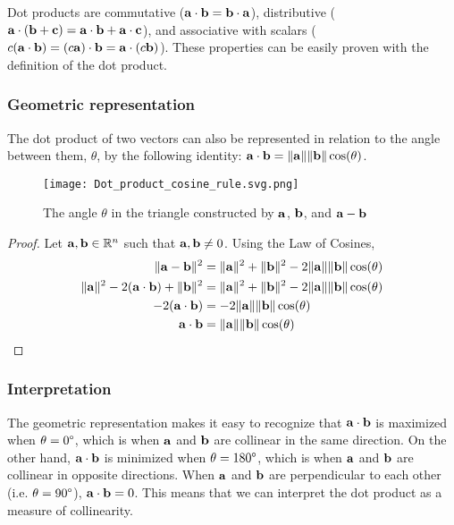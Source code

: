 \documentclass[../main.tex]{subfiles}
\begin{document}
Dot products are commutative ($\mathbf{a} \cdot \mathbf{b} = \mathbf{b} \cdot \mathbf{a}$),
distributive ($\mathbf{a} \cdot (\mathbf{b} + \mathbf{c}) = \mathbf{a} \cdot \mathbf{b} + \mathbf{a} \cdot \mathbf{c}$),
and associative with scalars ($c(\mathbf{a} \cdot \mathbf{b}) = (c\mathbf{a}) \cdot \mathbf{b} = \mathbf{a} \cdot (c\mathbf{b})$).
These properties can be easily proven with the definition of the dot product.

\subsubsection{Geometric representation}

The dot product of two vectors can also
be represented in relation to the angle between them, $\theta$, by
the following identity: $\mathbf{a} \cdot \mathbf{b} = \|\mathbf{a}\| \|\mathbf{b}\| \cos (\theta)$.

\begin{figure}[H]
	\centering
	\texttt{[image: Dot\_product\_cosine\_rule.svg.png]}
	\caption{The angle $\theta$ in the triangle constructed
		by $\mathbf{a}$, $\mathbf{b}$, and $\mathbf{a} - \mathbf{b}$}
\end{figure}

\begin{proof}
	Let $\mathbf{a}, \mathbf{b} \in \mathbb{R}^n$ such that $\mathbf{a}, \mathbf{b} \neq 0$. Using the Law of Cosines,
	\begin{align*}
		\|\mathbf{a}-\mathbf{b}\|^2                                    & = \|\mathbf{a}\|^2 + \|\mathbf{b}\|^2 - 2\|\mathbf{a}\| \|\mathbf{b}\| \cos (\theta) \\
		\|\mathbf{a}\|^2 - 2(\mathbf{a}\cdot\mathbf{b}) + \|\mathbf{b}\|^2 & = \|\mathbf{a}\|^2+\|\mathbf{b}\|^2-2\|\mathbf{a}\|\|\mathbf{b}\|\cos (\theta)       \\
		-2(\mathbf{a}\cdot\mathbf{b})                                  & =-2\|\mathbf{a}\|\|\mathbf{b}\|\cos (\theta)                                     \\
		\mathbf{a}\cdot\mathbf{b}                                      & =\|\mathbf{a}\|\|\mathbf{b}\|\cos (\theta)                                       \\
	\end{align*}
\end{proof}

\subsubsection{Interpretation}

The geometric representation makes it easy to recognize that
$\mathbf{a}\cdot\mathbf{b}$ is maximized when $\theta=0\degree$, which is
when $\mathbf{a}$ and $\mathbf{b}$ are collinear in the same direction.
On the other hand, $\mathbf{a}\cdot\mathbf{b}$ is minimized when $\theta=180\degree$,
which is when $\mathbf{a}$ and $\mathbf{b}$ are collinear in opposite directions.
When $\mathbf{a}$ and $\mathbf{b}$ are perpendicular to each other (i.e. $\theta=90\degree$),
$\mathbf{a}\cdot\mathbf{b}=0$. This means that we can interpret the dot product as a measure
of collinearity.
\end{document}
